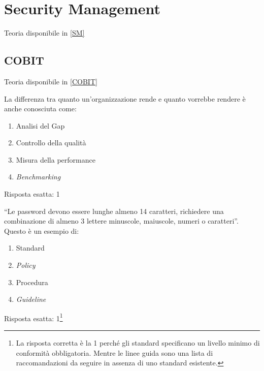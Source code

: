 \chapter{Security Management}
\label{esSM}

Teoria disponibile in \ref{SM}

\section{COBIT}
\label{esSM:COBIT}

Teoria disponibile in \ref{COBIT}

\begin{Exercise} [
  title={Quiz},
  label={esSM1}
  ]

  \Question La differenza tra quanto un'organizzazione rende e quanto 
  vorrebbe rendere è anche conosciuta come:
\begin{enumerate}
 \item Analisi del Gap
 \item Controllo della qualità
 \item Misura della performance
 \item \textit{Benchmarking}
\end{enumerate}

\end{Exercise}

\begin{Answer} [
  ref={esSM1},
  number={1}
  ]

  \Question Risposta esatta: 1
\end{Answer}


\begin{Exercise} [
  title={Quiz},
  label={esSM2}
  ]

  \Question ``Le password devono essere lunghe almeno 14 caratteri, 
richiedere una combinazione di almeno 3 lettere minuscole, maiuscole, numeri o 
caratteri''. Questo è un esempio di:
\begin{enumerate}
 \item Standard
 \item \textit{Policy}
 \item Procedura
 \item \textit{Guideline}
\end{enumerate}

\end{Exercise}

\begin{Answer} [
  ref={esSM2},
  number={2}
  ]

  \Question Risposta esatta: 1\footnote{La risposta corretta è la 1 perché
  gli standard specificano un livello minimo di conformità obbligatoria.
  Mentre le linee guida sono una lista di raccomandazioni da seguire in
  assenza di uno standard esistente.}
\end{Answer}


